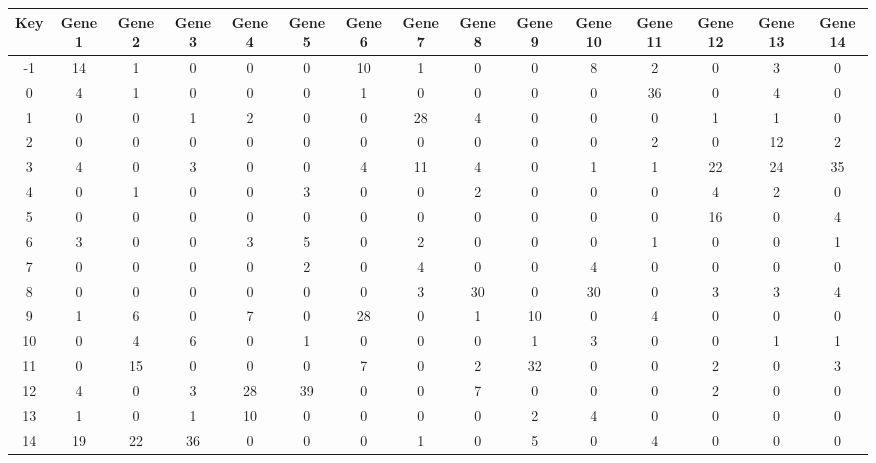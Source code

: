 \begin{tabular}{|c|c|c|c|c|c|c|c|c|c|c|c|c|c|c|}
\hline
Key & Gene 1 & Gene 2 & Gene 3 & Gene 4 & Gene 5 & Gene 6 & Gene 7 & Gene 8 & Gene 9 & Gene 10 & Gene 11 & Gene 12 & Gene 13 & Gene 14 \\
\hline
-1 & 14 & 1 & 0 & 0 & 0 & 10 & 1 & 0 & 0 & 8 & 2 & 0 & 3 & 0 \\
0 & 4 & 1 & 0 & 0 & 0 & 1 & 0 & 0 & 0 & 0 & 36 & 0 & 4 & 0 \\
1 & 0 & 0 & 1 & 2 & 0 & 0 & 28 & 4 & 0 & 0 & 0 & 1 & 1 & 0 \\
2 & 0 & 0 & 0 & 0 & 0 & 0 & 0 & 0 & 0 & 0 & 2 & 0 & 12 & 2 \\
3 & 4 & 0 & 3 & 0 & 0 & 4 & 11 & 4 & 0 & 1 & 1 & 22 & 24 & 35 \\
4 & 0 & 1 & 0 & 0 & 3 & 0 & 0 & 2 & 0 & 0 & 0 & 4 & 2 & 0 \\
5 & 0 & 0 & 0 & 0 & 0 & 0 & 0 & 0 & 0 & 0 & 0 & 16 & 0 & 4 \\
6 & 3 & 0 & 0 & 3 & 5 & 0 & 2 & 0 & 0 & 0 & 1 & 0 & 0 & 1 \\
7 & 0 & 0 & 0 & 0 & 2 & 0 & 4 & 0 & 0 & 4 & 0 & 0 & 0 & 0 \\
8 & 0 & 0 & 0 & 0 & 0 & 0 & 3 & 30 & 0 & 30 & 0 & 3 & 3 & 4 \\
9 & 1 & 6 & 0 & 7 & 0 & 28 & 0 & 1 & 10 & 0 & 4 & 0 & 0 & 0 \\
10 & 0 & 4 & 6 & 0 & 1 & 0 & 0 & 0 & 1 & 3 & 0 & 0 & 1 & 1 \\
11 & 0 & 15 & 0 & 0 & 0 & 7 & 0 & 2 & 32 & 0 & 0 & 2 & 0 & 3 \\
12 & 4 & 0 & 3 & 28 & 39 & 0 & 0 & 7 & 0 & 0 & 0 & 2 & 0 & 0 \\
13 & 1 & 0 & 1 & 10 & 0 & 0 & 0 & 0 & 2 & 4 & 0 & 0 & 0 & 0 \\
14 & 19 & 22 & 36 & 0 & 0 & 0 & 1 & 0 & 5 & 0 & 4 & 0 & 0 & 0 \\
\hline
\end{tabular}